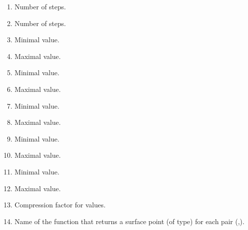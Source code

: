 \begin{itemize}
\begin{enumerate}
\item {} Number of  steps.
\item {} Number of  steps.
\item {} Minimal  value.
\item {} Maximal  value.
\item {} Minimal  value.
\item {} Maximal  value.
\item {} Minimal  value.
\item {} Maximal  value.
\item {} Minimal  value.
\item {} Maximal  value.
\item {} Minimal  value.
\item {} Maximal  value.
\item {} Compression factor for 
values.
\item {} Name of the function that
returns a surface point (of  type)
for each pair (,).
\end{enumerate}
\end{itemize}


